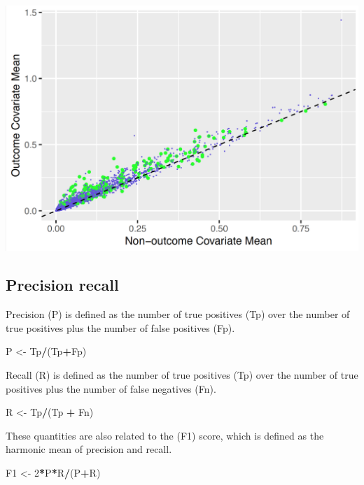\documentclass[]{book}
\newenvironment{Shaded}{\begin{snugshade}}{\end{snugshade}}
\newcommand{\DecValTok}[1]{\textcolor[rgb]{0.00,0.00,0.81}{#1}}
\newcommand{\StringTok}[1]{\textcolor[rgb]{0.31,0.60,0.02}{#1}}
\newcommand{\OperatorTok}[1]{\textcolor[rgb]{0.81,0.36,0.00}{\textbf{#1}}}
\newcommand{\NormalTok}[1]{#1}
\begin{document}
\includegraphics{images/PatientLevelPrediction/variableScatterplot.png}

\newpage

\subsection{Precision recall}\label{precision-recall}

Precision (P) is defined as the number of true positives (Tp) over the
number of true positives plus the number of false positives (Fp).

\begin{Shaded}
\begin{Highlighting}[]
\NormalTok{P <-}\StringTok{ }\NormalTok{Tp}\OperatorTok{/}\NormalTok{(Tp}\OperatorTok{+}\NormalTok{Fp)}
\end{Highlighting}
\end{Shaded}

Recall (R) is defined as the number of true positives (Tp) over the
number of true positives plus the number of false negatives (Fn).

\begin{Shaded}
\begin{Highlighting}[]
\NormalTok{R <-}\StringTok{ }\NormalTok{Tp}\OperatorTok{/}\NormalTok{(Tp }\OperatorTok{+}\StringTok{ }\NormalTok{Fn)}
\end{Highlighting}
\end{Shaded}

These quantities are also related to the (F1) score, which is defined as
the harmonic mean of precision and recall.

\begin{Shaded}
\begin{Highlighting}[]
\NormalTok{F1 <-}\StringTok{ }\DecValTok{2}\OperatorTok{*}\NormalTok{P}\OperatorTok{*}\NormalTok{R}\OperatorTok{/}\NormalTok{(P}\OperatorTok{+}\NormalTok{R)}
\end{Highlighting}
\end{Shaded}
\end{document}

